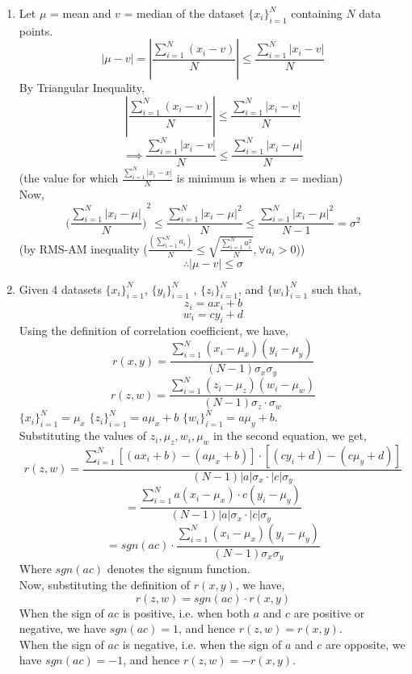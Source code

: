 \documentclass[11pt]{article}
\begin{document}
\begin{enumerate}
	\item{
	Let $\mu$ = mean and $v$ = median of the dataset $\{x_i\}_{i=1}^{N}$ containing $N$ data points.
	$$ \left|\mu - v\right| = \left|\frac{\sum_{i=1}^{N}(x_i - v)}{N}\right| \leq \frac{\sum_{i=1}^{N}\left|x_i - v\right|}{N}$$
	By Triangular Inequality,
	$$ \left|\frac{\sum_{i=1}^{N}(x_i - v)}{N}\right| \leq \frac{\sum_{i=1}^{N}\left|x_i - v\right|}{N} $$ 
	$$ \implies  \frac{\sum_{i=1}^{N}\left|x_i - v\right|}{N} \leq \frac{\sum_{i=1}^{N}\left|x_i - \mu \right|}{N} $$
	\hfill(the value for which $ \frac{\sum_{i=1}^{N}\left|x_i - x\right|}{N} $  is minimum is when $x$ = median) \\
	Now, \\
	$$ {\Bigg(\frac{\sum_{i=1}^{N}\left|x_i -\mu\right|}{N}\Bigg)}^2 \leq \frac{\sum_{i=1}^{N}{\left|x_i -\mu\right|}^2}{N} \leq \frac{\sum_{i=1}^{N}{\left|x_i -\mu\right|}^2}{N-1} = \sigma^2 $$
	\hfill{ (by RMS-AM inequality ($\frac{(\sum_{i=1}^N{a_i})}{N} \leq \sqrt{\frac{\sum_{i=1}^N{a_i^2}}{N}}, \forall a_i > 0$))} \\
	$$ \therefore \left|\mu - v\right| \leq \sigma $$
	} 


	\item {
	Given 4 datasets $\{x_i\}_{i=1}^{N}$, $\{y_i\}_{i=1}^{N}$ , $\{z_i\}_{i=1}^{N}$, and $\{w_i\}_{i=1}^{N}$ such that,
	$$ z_i = ax_i+b $$ $$ w_i = cy_i+d $$ 
	Using the definition of correlation coefficient, we have,
	$$ r(x,y) = \frac{\sum_{i=1}^{N}{(x_i-\mu_x)(y_i-\mu_y)}}{(N-1)\sigma_x\sigma_y} $$
	$$ r(z,w) = \frac{\sum_{i=1}^{N}{(z_i-\mu_z)(w_i-\mu_w)}}{(N-1)\sigma_z \cdot \sigma_w} $$
	 $\{x_i\}_{i=1}^{N} = \mu_x $ $\{z_i\}_{i=1}^{N} = a\mu_x + b$  $\{w_i\}_{i=1}^{N} = a\mu_y + b$.\\

	Substituting the values of $z_i,\mu_z,w_i,\mu_w$ in the second equation, we get, 
	$$
	r(z,w) = \frac{\sum_{i=1}^{N}{[(ax_i+b)-(a\mu_x+b)] \cdot [(cy_i+d)-(c\mu_y+d)]}}{(N-1)\left|a\right|\sigma_x \cdot \left|c\right|\sigma_y} 
	$$
	$$ =  \frac{\sum_{i=1}^{N}{a(x_i-\mu_x) \cdot c(y_i-\mu_y)}}{(N-1)\left|a\right|\sigma_x \cdot \left|c\right|\sigma_y}$$
	$$ =  sgn(ac)\cdot\frac{\sum_{i=1}^{N}{(x_i-\mu_x)(y_i-\mu_y)}}{(N-1)\sigma_x\sigma_y} $$
	Where $sgn(ac)$ denotes the signum function. \\
	Now, substituting the definition of $r(x,y)$, we have, \\
	$$ r(z,w) = sgn(ac) \cdot r(x,y) $$
	When the sign of $ac$ is positive, i.e. when both $a$ and $c$ are positive or negative, we have $sgn(ac) = 1$, and hence $r(z,w) = r(x,y)$. \\
	When the sign of $ac$ is negative, i.e. when the sign of $a$ and $c$ are opposite, we have $sgn(ac) = -1$, and hence $r(z,w) = -r(x,y)$. \\
	}


\end{enumerate}
\end{document}
